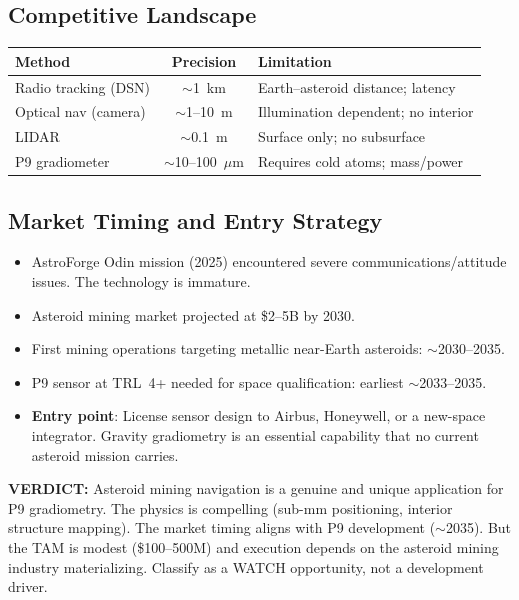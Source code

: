 \documentclass[11pt]{article}
\theoremstyle{definition}
\theoremstyle{remark}
\newcommand{\verdict}[1]{\textcolor{green!50!black}{\textbf{VERDICT:} #1}}
\begin{document}
\subsection{Competitive Landscape}

\begin{center}
\begin{tabular}{lcl}
\toprule
\textbf{Method} & \textbf{Precision} & \textbf{Limitation} \\
\midrule
Radio tracking (DSN) & $\sim$1~km & Earth--asteroid distance; latency \\
Optical nav (camera) & $\sim$1--10~m & Illumination dependent; no interior \\
LIDAR & $\sim$0.1~m & Surface only; no subsurface \\
P9 gradiometer & $\sim$10--100~$\mu$m & Requires cold atoms; mass/power \\
\bottomrule
\end{tabular}
\end{center}

\subsection{Market Timing and Entry Strategy}

\begin{itemize}
  \item AstroForge Odin mission (2025) encountered severe
    communications/attitude issues. The technology is immature.
  \item Asteroid mining market projected at \$2--5B by 2030.
  \item First mining operations targeting metallic near-Earth
    asteroids: $\sim$2030--2035.
  \item P9 sensor at TRL~4+ needed for space qualification:
    earliest $\sim$2033--2035.
  \item \textbf{Entry point}: License sensor design to Airbus,
    Honeywell, or a new-space integrator. Gravity gradiometry
    is an essential capability that no current asteroid mission
    carries.
\end{itemize}

\verdict{Asteroid mining navigation is a genuine and unique application
for P9 gradiometry. The physics is compelling (sub-mm positioning,
interior structure mapping). The market timing aligns with P9
development ($\sim$2035). But the TAM is modest (\$100--500M) and
execution depends on the asteroid mining industry materializing.
Classify as a WATCH opportunity, not a development driver.}
\end{document}

